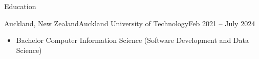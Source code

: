 \documentclass[]{mcdowellcv}
\begin{document}
    \makeheader
    
    \begin{cvsection}{Education}
        \begin{cvsubsection}{Auckland, New Zealand}{Auckland University of Technology}{Feb 2021 -- July 2024}
            \begin{itemize}
				
				\vspace{0.22cm}
                \item Bachelor Computer Information Science (Software Development and Data Science)
            \end{itemize}
        \end{cvsubsection}
    \end{cvsection}
    
\end{document}
